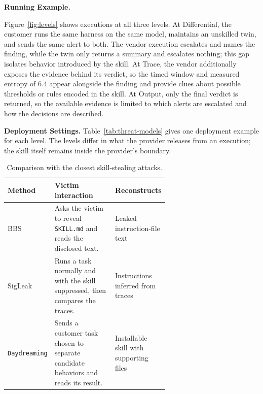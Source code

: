 \documentclass[letterpaper,twocolumn,10pt]{article}
\newcommand{\method}{\texttt{Daydreaming}\xspace}
\newcommand{\paragraphtitle}[1]{%
  \vspace{5pt}\noindent\textbf{#1.}%
}
\begin{document}
\paragraphtitle{Running Example}
Figure~\ref{fig:levels} shows executions at all three levels. At Differential, the customer runs the same harness on the same model, maintains an unskilled twin, and sends the same alert to both. The vendor execution escalates and names the finding, while the twin only returns a summary and escalates nothing; this gap isolates behavior introduced by the skill. At Trace, the vendor additionally exposes the evidence behind its verdict, so the timed window and measured entropy of $6.4$ appear alongside the finding and provide clues about possible thresholds or rules encoded in the skill. At Output, only the final verdict is returned, so the available evidence is limited to which alerts are escalated and how the decisions are described.


\paragraphtitle{Deployment Settings} Table~\ref{tab:threat-models} gives one deployment example for each level.
The levels differ in what the provider releases from an execution; the skill
itself remains inside the provider's boundary.

\begin{table}[ht]
  \centering
  \footnotesize
  \caption{Comparison with the closest skill-stealing attacks.}
  \label{tab:closest-attacks}
  \begin{tabularx}{\linewidth}{@{}p{0.20\linewidth}p{0.43\linewidth}Y@{}}
    \toprule
    Method & Victim interaction & Reconstructs \\
    \midrule
    BBS~\cite{wang2026blackboxskill}
      & Asks the victim to reveal \texttt{SKILL.md} and reads the disclosed text.
      & Leaked instruction-file text \\
    SigLeak~\cite{geng2026agentskills}
      & Runs a task normally and with the skill suppressed, then compares the traces.
      & Instructions inferred from traces \\
    \method
      & Sends a customer task chosen to separate candidate behaviors and reads its result.
      & Installable skill with supporting files \\
    \bottomrule
  \end{tabularx}
\end{table}
\end{document}
